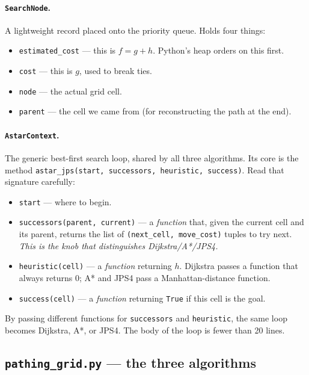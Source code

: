 \documentclass[11pt,a4paper]{article}
\begin{document}
\paragraph{\texttt{SearchNode}.}
A lightweight record placed onto the priority queue. Holds four things:
\begin{itemize}[leftmargin=20pt,itemsep=1pt]
  \item \texttt{estimated\_cost} --- this is $f = g + h$. Python's heap orders on this first.
  \item \texttt{cost} --- this is $g$, used to break ties.
  \item \texttt{node} --- the actual grid cell.
  \item \texttt{parent} --- the cell we came from (for reconstructing the path at the end).
\end{itemize}

\paragraph{\texttt{AstarContext}.}
The generic best-first search loop, shared by all three algorithms. Its core is the method \texttt{astar\_jps(start, successors, heuristic, success)}. Read that signature carefully:

\begin{itemize}[leftmargin=20pt,itemsep=1pt]
  \item \texttt{start} --- where to begin.
  \item \texttt{successors(parent, current)} --- a \emph{function} that, given the current cell and its parent, returns the list of \texttt{(next\_cell, move\_cost)} tuples to try next. \textit{This is the knob that distinguishes Dijkstra/A*/JPS4.}
  \item \texttt{heuristic(cell)} --- a \emph{function} returning $h$. Dijkstra passes a function that always returns 0; A* and JPS4 pass a Manhattan-distance function.
  \item \texttt{success(cell)} --- a \emph{function} returning \texttt{True} if this cell is the goal.
\end{itemize}

By passing different functions for \texttt{successors} and \texttt{heuristic}, the same loop becomes Dijkstra, A*, or JPS4. The body of the loop is fewer than 20 lines.

\subsection{\texttt{pathing\_grid.py} --- the three algorithms}
\end{document}
